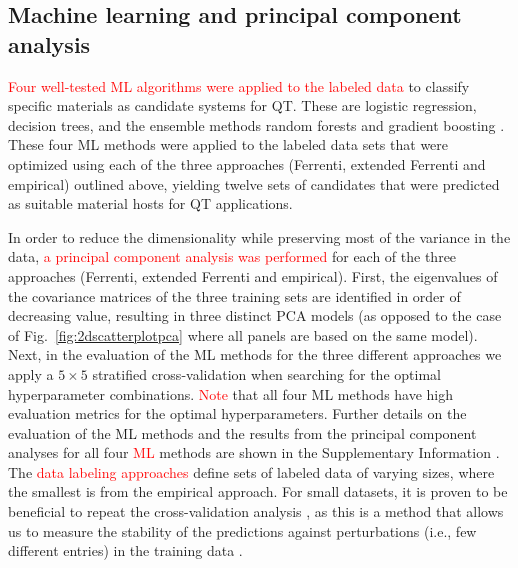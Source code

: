 \documentclass[superscriptaddress,unsortedaddress,
 amsmath,amssymb,
 aps,
]{revtex4-2}
\newcommand{\mrk}[1]{\textcolor{red}{#1}}
\begin{document}

\subsection*{Machine learning and principal component analysis}
\mrk{Four well-tested ML algorithms were applied to the labeled data} to classify specific materials as candidate systems for QT. These are logistic regression, decision trees, and the ensemble methods random forests and gradient boosting \cite{Mehta2019,Hastie2009,Murphy2012}. 
These four ML methods were applied to the labeled data sets that were optimized using each of the three approaches (Ferrenti, extended Ferrenti and empirical) outlined above, yielding twelve sets of candidates that were predicted as suitable material hosts for QT applications.  

In order to reduce the dimensionality while preserving most of the variance in the data, 
\mrk{a principal component analysis  \cite{Jolliffe2002} was performed} for each of the three approaches (Ferrenti, extended Ferrenti and empirical).
First, the eigenvalues of the covariance matrices of the three training sets are identified in order of decreasing value, resulting in three distinct PCA models (as opposed to the case of Fig.~\ref{fig:2dscatterplotpca} where all panels are based on the same model). 
Next, in the evaluation of the ML methods for the three different approaches we apply a $5\times 5$ stratified cross-validation \cite{Hastie2009} when searching for the optimal hyperparameter combinations. \mrk{Note} that all four ML methods have high evaluation metrics for the optimal hyperparameters. Further details on the evaluation of the ML methods and the results from the principal component analyses for all four \mrk{ML} methods are shown in the Supplementary Information \cite{supplementary}.  
The \mrk{data labeling approaches} define sets of labeled data of varying sizes, where the smallest is from the empirical approach. For small datasets, it is proven to be beneficial to repeat the cross-validation analysis \cite{Hastie2009}, as this is a method that allows us to measure the stability of the predictions against perturbations (i.e., few different entries) in the training data \cite{Beleites2008}.
\end{document}
